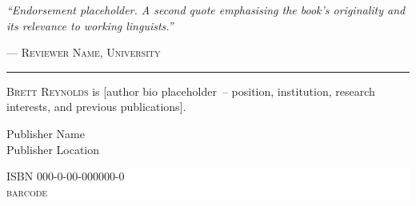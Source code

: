 \begin{center}
\begin{minipage}{0.84\textwidth}
\vspace{7pt}

{\centering\fontsize{8.8pt}{12pt}\selectfont
\textit{\enquote{Endorsement placeholder. A second quote
emphasising the book's originality and its relevance to working
linguists.}}\par
\vspace{2pt}
{\fontsize{8pt}{10pt}\selectfont
 \scshape
 --- Reviewer Name, University}\par}

\vspace{6pt}
{\centering\textcolor{CoverGold}{\rule{0.88\textwidth}{0.35pt}}\par}
\vspace{6pt}

{\fontsize{8.2pt}{11.2pt}\selectfont\color{CoverWhite!72}%
\textsc{Brett Reynolds} is [author bio placeholder~-- position,
institution, research interests, and previous publications].\par}

\end{minipage}
\end{center}

\vfill

\noindent\hspace{10mm}%
\begin{minipage}[b]{0.40\textwidth}
{\fontsize{7.4pt}{9.6pt}\selectfont\color{CoverWhite!55}%
Publisher Name\\Publisher Location}
\end{minipage}%
\hfill
\begin{minipage}[b]{0.40\textwidth}
\raggedleft
\colorbox{white}{\parbox[c][19mm][c]{35mm}{%
  \centering\fontsize{7pt}{9pt}\selectfont\color{black}%
  ISBN 000-0-00-000000-0\\[6pt]
  \textsc{barcode}}}
\end{minipage}\hspace{10mm}%

\vspace*{5mm}
